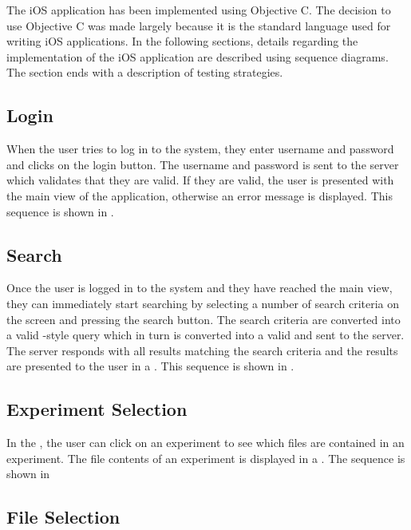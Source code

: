 The iOS application has been implemented using Objective C. The decision to use Objective C was made largely because it is the standard language used for writing iOS applications. 
In the following sections, details regarding the implementation of the iOS application are described using sequence diagrams. The section ends with a description of testing strategies.

\subsection{Login}

When the user tries to log in to the system, they enter username and password and clicks on the login button. The username and password is sent to the server which validates that they are valid. If they are valid, the user is presented with the main view of the application, otherwise an error message is displayed. This sequence is shown in .


\subsection{Search}

Once the user is logged in to the system and they have reached the main view, they can immediately start searching by selecting a number of search criteria on the screen and pressing the search button. The search criteria are converted into a valid -style query which in turn is converted into a valid  and sent to the server. The server responds with all results matching the search criteria and the results are presented to the user in a . This sequence is shown in .


\subsection{Experiment Selection}

In the , the user can click on an experiment to see which files are contained in an experiment. The file contents of an experiment is displayed in a . The sequence is shown in  


\subsection{File Selection}

